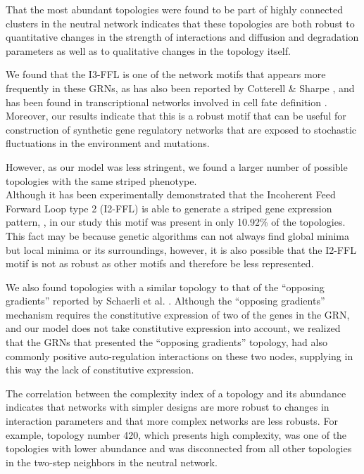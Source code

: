 \documentclass[10pt,letterpaper]{article}
\begin{document}
That the most abundant topologies were found to be part of highly connected 
clusters in the neutral network indicates that these topologies are both robust 
to quantitative changes in the strength of interactions and diffusion and 
degradation parameters as well as to qualitative changes in the topology 
itself.

We found that the I3-FFL is one of the network motifs that appears more
frequently in these GRNs, as has also been reported by Cotterell \& Sharpe
\cite{Cotterell2010}, and has been found in transcriptional networks involved 
in cell fate definition \cite{Li2019}. Moreover, our results indicate that this 
is a robust motif that can be useful for construction of synthetic gene 
regulatory networks that are exposed to stochastic fluctuations in the 
environment and mutations.

However, as our model was less stringent, we found a larger number of possible 
topologies with the same striped phenotype.\\

Although it has been experimentally demonstrated that the Incoherent Feed 
Forward Loop type 2 (I2-FFL) is able to generate a striped gene expression 
pattern, \cite{Schaerli2014, Basu2005}, in our study this motif was present in 
only 10.92\% of the topologies. This fact may be because genetic algorithms 
can not always find global minima but local minima or its surroundings, however,
it is also possible that the I2-FFL motif is not as robust as other motifs and 
therefore be less represented.

We also found topologies with a similar topology to that of the “opposing
gradients” reported by Schaerli et al. \cite{Schaerli2018,Schaerli2014}.
Although the “opposing gradients” mechanism requires the constitutive expression
of two of the genes in the GRN, and our model does not take constitutive
expression into account, we realized that the GRNs that presented the “opposing
gradients” topology, had also commonly positive auto-regulation interactions on
these two nodes, supplying in this way the lack of constitutive expression.

The correlation between the complexity index of a topology and its abundance 
indicates that networks with simpler designs are more robust to changes in 
interaction parameters and that more complex networks are less robusts. For 
example, topology number 420, which presents high complexity, was one of the 
topologies with lower abundance and was disconnected from all other topologies 
in the two-step neighbors in the neutral network.
\end{document}
